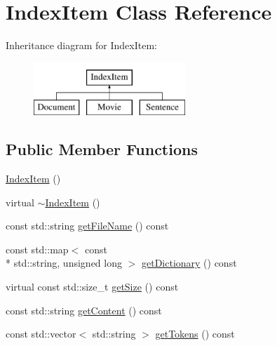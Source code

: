 \hypertarget{classIndexItem}{\section{Index\-Item Class Reference}
\label{classIndexItem}
}
Inheritance diagram for Index\-Item\-:\begin{figure}[H]
\begin{center}
\leavevmode
\includegraphics[height=2.000000cm]{classIndexItem}
\end{center}
\end{figure}
\subsection*{Public Member Functions}
\begin{DoxyCompactItemize}
\item 
\hyperlink{classIndexItem_aa37a5377a9cdd5993b09baad3d842a6f}{Index\-Item} ()
\item 
virtual \hyperlink{classIndexItem_a6225b6cb69e5dc134d2a7cea952cdd17}{$\sim$\-Index\-Item} ()
\item 
const std\-::string \hyperlink{classIndexItem_a6f49a15ad6cf5ede9b0fa21cae49559a}{get\-File\-Name} () const 
\item 
const std\-::map$<$ const \\*
std\-::string, unsigned long $>$ \hyperlink{classIndexItem_a1f2f7a89428e7dba96c1c0d53587b0ac}{get\-Dictionary} () const 
\item 
virtual const std\-::size\-\_\-t \hyperlink{classIndexItem_a96cbdc874ef50fd1f51bf39d526cabf8}{get\-Size} () const 
\item 
const std\-::string \hyperlink{classIndexItem_a3e14281afb512683feacb222b4ca7c88}{get\-Content} () const 
\item 
const std\-::vector$<$ std\-::string $>$ \hyperlink{classIndexItem_ac3dfba9c3e0fdab742bccc15631b8db8}{get\-Tokens} () const 
\end{DoxyCompactItemize}
